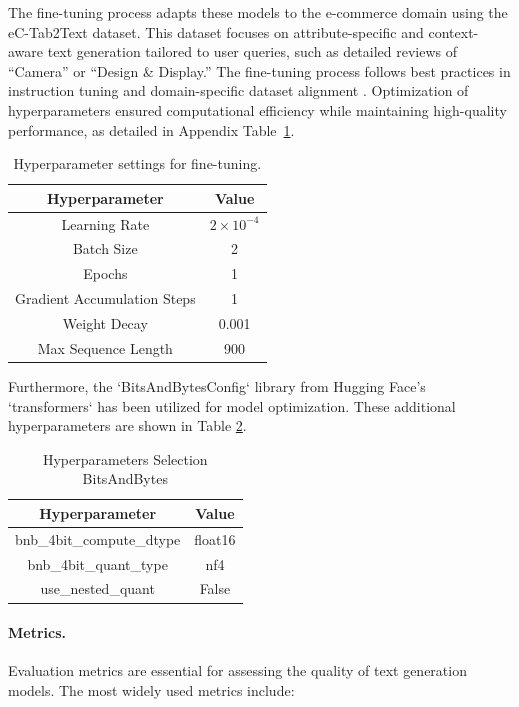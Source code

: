 The fine-tuning process adapts these models to the e-commerce domain using the eC-Tab2Text dataset. This dataset focuses on attribute-specific and context-aware text generation tailored to user queries, such as detailed reviews of ``Camera'' or ``Design \& Display.'' The fine-tuning process follows best practices in instruction tuning and domain-specific dataset alignment \cite{Zhang2023InstructionTF, Chang2023ASO}. Optimization of hyperparameters ensured computational efficiency while maintaining high-quality performance, as detailed in Appendix Table~\ref{table:hyperparameters}.

\begin{table}[ht]
    \centering
    \footnotesize
    \begin{tabular}{|c|c|}
    \hline
    \textbf{Hyperparameter} & \textbf{Value} \\
    \hline
    Learning Rate & $2 \times 10^{-4}$ \\
    Batch Size & 2 \\
    Epochs & 1 \\
    Gradient Accumulation Steps & 1 \\
    Weight Decay & 0.001 \\
    Max Sequence Length & 900 \\
    \hline
    \end{tabular}
    \caption{Hyperparameter settings for fine-tuning.}
    \label{table:hyperparameters}
\end{table}

Furthermore, the `BitsAndBytesConfig` library from Hugging Face's `transformers` has been utilized for model optimization. These additional hyperparameters are shown in Table \ref{table:hyperparameters-bitsandbytes}.
\begin{table}[H]
    \centering
    \begin{tabular}{|c|c|}
        \hline
        \textbf{Hyperparameter} & \textbf{Value} \\
        \hline
        bnb\_4bit\_compute\_dtype & float16 \\
        bnb\_4bit\_quant\_type & nf4 \\
        use\_nested\_quant & False \\
        \hline
    \end{tabular}
    \caption{Hyperparameters Selection BitsAndBytes}
    \label{table:hyperparameters-bitsandbytes}
\end{table}

\paragraph{Metrics.} Evaluation metrics are essential for assessing the quality of text generation models. The most widely used metrics include: 

